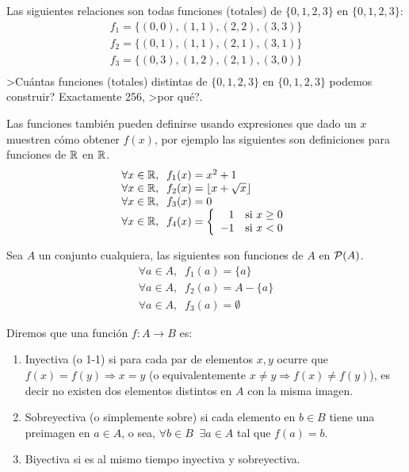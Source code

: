 \begin{ejemplo}
Las siguientes relaciones son todas funciones (totales) 
de $\{0,1,2,3\}$ en $\{0,1,2,3\}$:
\[
\begin{array}{l}
f_1=\{(0,0),(1,1),(2,2),(3,3)\} \\
f_2=\{(0,1),(1,1),(2,1),(3,1)\} \\
f_3=\{(0,3),(1,2),(2,1),(3,0)\} \\
\end{array}
\]
>Cuántas funciones (totales) 
distintas de $\{0,1,2,3\}$ en $\{0,1,2,3\}$ podemos construir?
Exactamente 256, >por qué?.
\end{ejemplo}

\begin{ejemplo}
Las funciones también pueden definirse usando expresiones que dado un $x$ muestren cómo obtener $f(x)$, por ejemplo las siguientes son definiciones para funciones de $\R$ en $\R$.
\[
\begin{array}{l}
\forall x\in\R,\;\; f_1(x)=x^2+1\\
\forall x\in\R,\;\; f_2(x)=\lfloor x+\sqrt{x}\rfloor\\
\forall x\in\R,\;\; f_3(x)=0 \\
\forall x\in\R,\;\; f_4(x)=\left\{
														\begin{array}{rr}
														1 & \text{si }x\geq 0\\
														-1 & \text{si }x<0
														\end{array}
														\right.
\end{array}
\]
\end{ejemplo}

\begin{ejemplo}
Sea $A$ un conjunto cualquiera, las siguientes son funciones de $A$ en $\P(A)$.
\[
\begin{array}{l}
\forall a\in A,\;\; f_1(a)=\{a\} \\
\forall a\in A,\;\; f_2(a)=A-\{a\} \\
\forall a\in A,\;\; f_3(a)=\emptyset
\end{array}
\]
\end{ejemplo}

\begin{definicion}
Diremos que una función $f:A\rightarrow B$ es:
\begin{enumerate}
  \item Inyectiva (o 1-1) si para cada par de elementos $x,y$ ocurre que $f(x)=f(y)\Rightarrow x=y$ (o equivalentemente $x\not=y\Rightarrow f(x)\not=f(y)$), es decir no existen dos elementos distintos en $A$ con la misma imagen.
  \item Sobreyectiva (o simplemente sobre) si cada elemento en $b\in B$ tiene una preimagen en $a\in A$, o sea, $\forall b\in B\;\;\exists a\in A$ tal que $f(a)=b$.
  \item Biyectiva si es al mismo tiempo inyectiva y sobreyectiva.
\end{enumerate}
\end{definicion}

